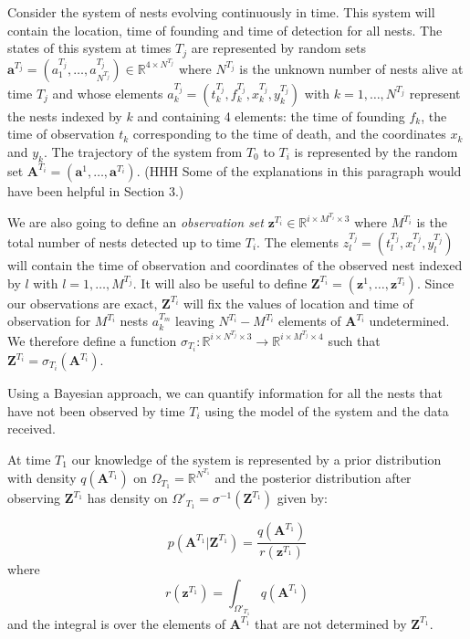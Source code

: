 \documentclass{article}
\renewcommand{\vec}[1]{\mathbf{#1}}
\begin{document}
Consider the system of nests evolving continuously in time. This system will contain the location, time of founding and time of detection for all nests. The states of this system at times $T_j$ are represented by random sets $\vec{a}^{T_j} = (a^{T_j}_1, \dots, a^{T_j}_{N^{T_j}}) \in \mathbb{R}^{4\times N^{T_j}}$ where $N^{T_j}$ is the unknown number of nests alive at time $T_j$ and whose elements $a^{T_j}_k = (t_k^{T_j}, f_k^{T_j}, x_k^{T_j}, y_k^{T_j})$ with $k = 1, \dots , N^{T_j}$ represent the nests indexed by $k$ and containing 4 elements: the time of founding $f_k$, the time of observation $t_k$ corresponding to the time of death, and the coordinates $x_k$ and $y_k$.
The trajectory of the system from $T_0$ to $T_i$ is represented by the random set $\vec{A}^{T_i} = (\vec{a}^1, \dots, \vec{a}^{T_i})$. (HHH Some of the explanations in this paragraph would have been helpful in Section 3.)

We are also going to define an \textit{observation set} $\vec{z}^{T_i} \in \mathbb{R}^{i \times M^{T_i} \times 3}$ where $M^{T_i}$ is the total number of nests detected up to time $T_i$. The elements $z^{T_j}_l = (t^{T_j}_l, x^{T_j}_l, y^{T_j}_l)$ will contain the time of observation and coordinates of the observed nest indexed by $l$ with $l = 1, \dots, M^{T_j}$. It will also be useful to define $\vec{Z}^{T_i} = (\vec{z}^1, \dots, \vec{z}^{T_i})$. Since our observations are exact, $\vec{Z}^{T_i}$ will fix the values of location and time of observation for $M^{T_i}$ nests $a^{T_m}_k$ leaving $N^{T_i}-M^{T_i}$ elements of $\vec{A}^{T_i}$ undetermined. We therefore define a function $\sigma_{T_i}: \mathbb{R}^{i\times N^{T_j}\times 3} \rightarrow \mathbb{R}^{i\times M^{T_j}\times 4}$ such that $\vec{Z}^{T_i} = \sigma_{T_i}(\vec{A}^{T_i})$.

Using a Bayesian approach, we can quantify information for all the nests that have not been observed by time $T_i$ using the model of the system and the data received.

At time $T_1$ our knowledge of the system is represented by a prior distribution with density $q(\vec{A}^{T_1})$ on $\Omega_{T_1} = \mathbb{R}^{N^{T_1}}$ and the posterior distribution after observing $\vec{Z}^{T_1}$ has density on $\Omega'_{T_1} = \sigma^{-1}(\vec{Z}^{T_1})$ given by:

\begin{equation*}
    p(\vec{A}^{T_1} | \vec{Z}^{T_1}) = \frac{q(\vec{A}^{T_1})}{r(\vec{z}^{T_1})}
\end{equation*}
where
\begin{equation*}
    r(\vec{z}^{T_1}) = \int_{\Omega'_{T_1}} q(\vec{A}^{T_1}) 
\end{equation*}
and the integral is over the elements of $\vec{A}^{T_1}$ that are not determined by $\vec{Z}^{T_1}$.
\end{document}
